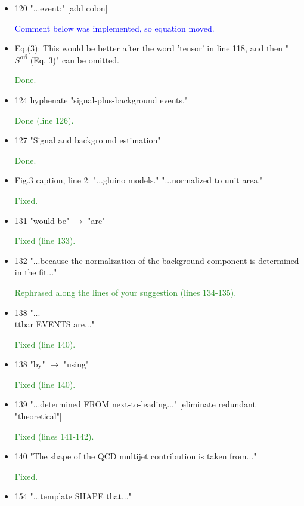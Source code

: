 \documentclass[paper=a4, fontsize=11pt]{scrartcl}
\begin{document}
\begin{itemize}
\item 120 "...event:" [add colon]

\textcolor{blue}{Comment below was implemented, so equation moved.}

\item Eq.(3): This would be better after the word 'tensor' in line 118, and then
"$S^{\alpha \beta}$ (Eq. 3)"  can be omitted.

\textcolor{ForestGreen}{Done.}

\item 124 hyphenate "signal-plus-background events."

\textcolor{ForestGreen}{Done (line 126).}

\item 127 "Signal and background estimation"

\textcolor{ForestGreen}{Done.}

\item Fig.3 caption, line 2:
 "...gluino models."
 "...normalized to unit area."
 
\textcolor{ForestGreen}{Fixed.}

\item 131 "would be" $\rightarrow$  "are"

\textcolor{ForestGreen}{Fixed (line 133).}

\item 132 "...because the normalization of the background component
 is determined in the fit..."
 
\textcolor{ForestGreen}{Rephrased along the lines of your suggestion (lines 134-135).}

\item 138 "...\\ttbar EVENTS are..."

\textcolor{ForestGreen}{Fixed (line 140).}

\item 138 "by" $\rightarrow$  "using"

\textcolor{ForestGreen}{Fixed (line 140).}

\item 139 "...determined FROM next-to-leading..."
 [eliminate redundant "theoretical"]
 
\textcolor{ForestGreen}{Fixed (lines 141-142).}

\item 140 "The shape of the QCD multijet contribution is taken from..."

\textcolor{ForestGreen}{Fixed.}

\item 154 "...template SHAPE that..."


\end{itemize}
\end{document}
